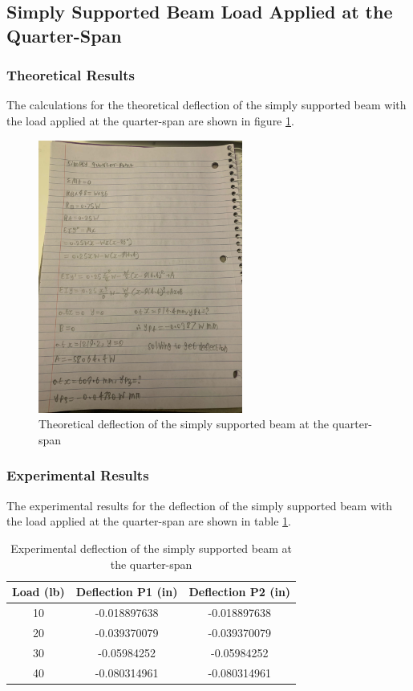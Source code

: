 \documentclass[12pt, titlepage]{article}
\begin{document}
\subsection{Simply Supported Beam Load Applied at the Quarter-Span}
\subsubsection{Theoretical Results}
The calculations for the theoretical deflection of the simply supported beam
with the load applied at the quarter-span are shown in figure
\ref{fig:TheoreticalSimplySupportedBeamQuarter}.
\begin{figure}[H]
    \centering
    \includegraphics[width=0.6\textwidth]{./Images/S_Q.jpeg}
    \caption{Theoretical deflection of the simply supported beam at the quarter-span}
    \label{fig:TheoreticalSimplySupportedBeamQuarter}
\end{figure}
\newpage
\subsubsection{Experimental Results}
The experimental results for the deflection of the simply supported beam with
the load applied at the quarter-span are shown in table
\ref{tab:ExperimentalSimplySupportedBeamQuarter}.
\begin{table}[H]
    \centering
    \caption{Experimental deflection of the simply supported beam at the quarter-span}
    \label{tab:ExperimentalSimplySupportedBeamQuarter}
    \begin{tabular}{|c|c|c|}
        \hline
        \textbf{Load (lb)} & \textbf{Deflection P1 (in)} & \textbf{Deflection P2 (in)}\\
        \hline
        10 & -0.018897638 & -0.018897638 \\
        \hline
        20 & -0.039370079 & -0.039370079 \\
        \hline
        30 & -0.05984252 & -0.05984252 \\
        \hline
        40 & -0.080314961 & -0.080314961 \\
        \hline
    \end{tabular}
\end{table}
\end{document}
